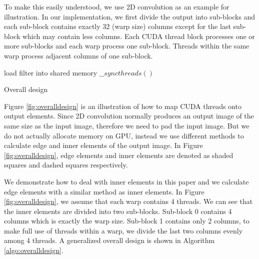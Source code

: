 \documentclass[sigplan,review,anonymous]{acmart}\settopmatter{printfolios=true,printccs=false,printacmref=false}
\begin{document}
To make this easily understood, we use 2D convolution as an example for illustration. In our implementation, we first divide the output into sub-blocks and each sub-block contains exactly 32 (warp size) columns except for the last sub-block which may contain less columns. Each CUDA thread block processes one or more sub-blocks and each warp process one sub-block. Threads within the same warp process adjacent columns of one sub-block.
\begin{algorithm}
	load filter into shared memory\;
	$\_\_syncthreads()$\;
	\caption{Overall design}
	\label{algo:overalldesign}
\end{algorithm}

Figure \ref{fig:overalldesign} is an illustration of how to map CUDA threads onto output elements. Since 2D convolution normally produces an output image of the same size as the input image, therefore we need to pad the input image. But we do not actually allocate memory on GPU, instead we use different methods to calculate edge and inner elements of the output image. In Figure \ref{fig:overalldesign}, edge elements and inner elements are denoted as shaded squares and dashed squares respectively.

We demonstrate how to deal with inner elements in this paper and we calculate edge elements with a similar method as inner elements. In Figure \ref{fig:overalldesign}, we assume that each warp contains 4 threads. We can see that the inner elements are divided into two sub-blocks. Sub-block 0 contains 4 columns which is exactly the warp size. Sub-block 1 contains only 2 columns, to make full use of threads within a warp, we divide the last two columns evenly among 4 threads. A generalized overall design is shown in Algorithm \ref{algo:overalldesign}.
\end{document}
